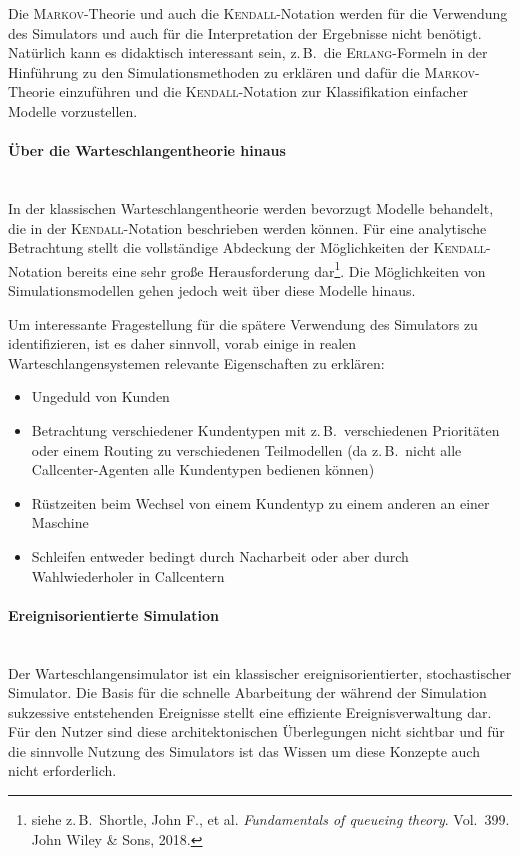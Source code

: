 \documentclass[deutsch]{svmono}
\begin{document}
Die \textsc{Markov}-Theorie und auch die \textsc{Kendall}-Notation werden für die Verwendung des Simulators und auch für die Interpretation der Ergebnisse nicht benötigt. Natürlich kann es didaktisch interessant sein, z.\,B.\ die \textsc{Erlang}-Formeln in der Hinführung zu den Simulationsmethoden zu erklären und dafür die \textsc{Markov}-Theorie einzuführen und die \textsc{Kendall}-Notation zur Klassifikation einfacher Modelle vorzustellen.

\paragraph{Über die Warteschlangentheorie hinaus}~\\
In der klassischen Warteschlangentheorie werden bevorzugt Modelle behandelt, die in der \textsc{Kendall}-Notation beschrieben werden können. Für eine analytische Betrachtung stellt die vollständige Abdeckung der Möglichkeiten der \textsc{Kendall}-Notation bereits eine sehr große Herausforderung dar\footnote{siehe z.\,B.\ Shortle, John F., et al. \emph{Fundamentals of queueing theory}. Vol.\ 399. John Wiley \& Sons, 2018.}. Die Möglichkeiten von Simulationsmodellen gehen jedoch weit über diese Modelle hinaus.

Um interessante Fragestellung für die spätere Verwendung des Simulators zu identifizieren, ist es daher sinnvoll, vorab einige in realen Warteschlangensystemen relevante Eigenschaften zu erklären:

\begin{itemize}
\item
Ungeduld von Kunden
\item
Betrachtung verschiedener Kundentypen mit z.\,B.\ verschiedenen Prioritäten oder einem Routing zu verschiedenen Teilmodellen (da z.\,B.\ nicht alle Callcenter-Agenten alle Kundentypen bedienen können)
\item
Rüstzeiten beim Wechsel von einem Kundentyp zu einem anderen an einer Maschine
\item
Schleifen entweder bedingt durch Nacharbeit oder aber durch Wahlwiederholer in Callcentern
\end{itemize}

\paragraph{Ereignisorientierte Simulation}~\\
Der Warteschlangensimulator ist ein klassischer ereignisorientierter, stochastischer Simulator. Die Basis für die schnelle Abarbeitung der während der Simulation sukzessive entstehenden Ereignisse stellt eine effiziente Ereignisverwaltung dar. Für den Nutzer sind diese architektonischen Überlegungen nicht sichtbar und für die sinnvolle Nutzung des Simulators ist das Wissen um diese Konzepte auch nicht erforderlich.
\end{document}
